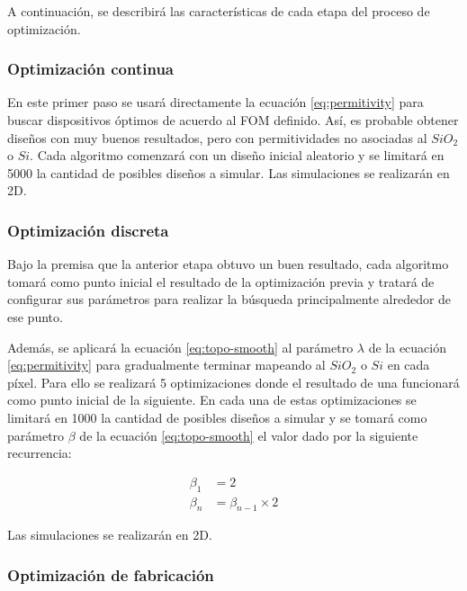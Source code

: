A continuación, se describirá las características de cada etapa del proceso de optimización.

\subsubsection{Optimización continua}

En este primer paso se usará directamente la ecuación \ref{eq:permitivity} para buscar dispositivos óptimos de acuerdo al FOM definido.
Así, es probable obtener diseños con muy buenos resultados, pero con permitividades no asociadas al $SiO_2$ o $Si$.
Cada algoritmo comenzará con un diseño inicial aleatorio y se limitará en 5000 la cantidad de posibles diseños a simular. 
Las simulaciones se realizarán en 2D.

\subsubsection{Optimización discreta}

Bajo la premisa que la anterior etapa obtuvo un buen resultado, cada algoritmo tomará como punto inicial el resultado de la optimización previa y tratará de configurar sus parámetros para realizar la búsqueda principalmente alrededor de ese punto.

Además, se aplicará la ecuación \ref{eq:topo-smooth} al parámetro $\lambda$ de la ecuación \ref{eq:permitivity} para gradualmente terminar mapeando al $SiO_2$ o $Si$ en cada píxel. 
Para ello se realizará 5 optimizaciones donde el resultado de una funcionará como punto inicial de la siguiente.
En cada una de estas optimizaciones se limitará en 1000 la cantidad de posibles diseños a simular y se tomará como parámetro $\beta$ de la ecuación \ref{eq:topo-smooth} el valor dado por la siguiente recurrencia:

\begin{equation}
  \begin{split}
    \beta_1 &= 2\\
    \beta_n &= \beta_{n-1} \times 2
  \end{split}
  \label{eq:beta-param}
\end{equation}

Las simulaciones se realizarán en 2D.

\subsubsection{Optimización de fabricación}

